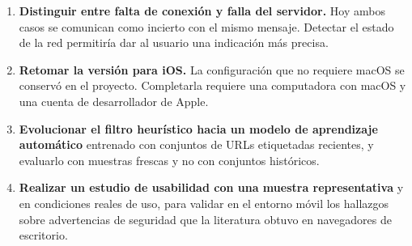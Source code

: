 \begin{enumerate}
	\item \textbf{Distinguir entre falta de conexión y falla del servidor.} Hoy ambos casos se comunican como incierto con el mismo mensaje. Detectar el estado de la red permitiría dar al usuario una indicación más precisa.

	\item \textbf{Retomar la versión para iOS.} La configuración que no requiere macOS se conservó en el proyecto. Completarla requiere una computadora con macOS y una cuenta de desarrollador de Apple.

	\item \textbf{Evolucionar el filtro heurístico hacia un modelo de aprendizaje automático} entrenado con conjuntos de URLs etiquetadas recientes, y evaluarlo con muestras frescas y no con conjuntos históricos.

	\item \textbf{Realizar un estudio de usabilidad con una muestra representativa} y en condiciones reales de uso, para validar en el entorno móvil los hallazgos sobre advertencias de seguridad que la literatura obtuvo en navegadores de escritorio.
\end{enumerate}

